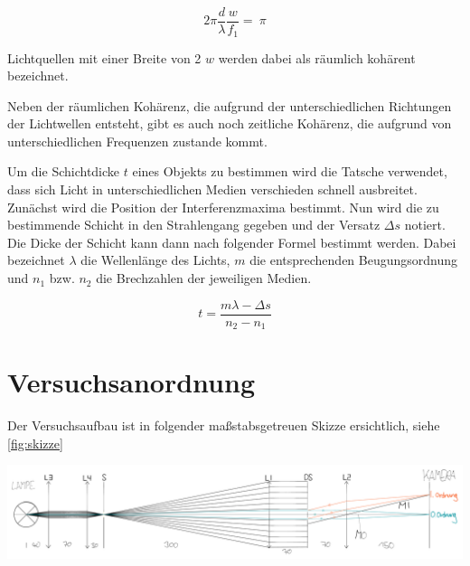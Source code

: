 \documentclass[11pt,ngerman]{scrartcl}
\begin{document}
\begin{equation}
	2\pi\frac{d}{\lambda}\frac{w}{f_1} = \ \pi
	\label{eq:minimumbedingung}
\end{equation}

\noindent Lichtquellen mit einer Breite von 2 $w$ werden dabei als räumlich kohärent bezeichnet.

\vspace{2mm}

\noindent Neben der räumlichen Kohärenz, die aufgrund der unterschiedlichen Richtungen der Lichtwellen entsteht, gibt es auch noch zeitliche Kohärenz, die aufgrund von  unterschiedlichen Frequenzen zustande kommt.

\vspace{2mm}

\noindent Um die Schichtdicke $t$ eines Objekts zu bestimmen wird die Tatsche
verwendet, dass sich Licht in unterschiedlichen Medien verschieden schnell
ausbreitet. Zunächst wird die Position der Interferenzmaxima bestimmt. Nun wird
die zu bestimmende Schicht in den Strahlengang gegeben und der Versatz $\Delta
	s$ notiert. Die Dicke der Schicht kann dann nach folgender Formel bestimmt
werden. Dabei bezeichnet $\lambda$ die Wellenlänge des Lichts, $m$ die
entsprechenden Beugungsordnung und $n_1$ bzw. $n_2$ die Brechzahlen der
jeweiligen Medien. \cite{vorlageinterfero}

\begin{equation}
	t = \frac{m\lambda - \Delta s}{n_2-n_1}
	\label{eq:dicke}
\end{equation}

\newpage

\section{Versuchsanordnung}\label{sec:Versuchsanordnung}

\noindent Der Versuchsaufbau ist in folgender maßstabsgetreuen Skizze ersichtlich, siehe \autoref{fig:skizze}

\begin{center}
	\begin{minipage}[t]{\textwidth}
		\centering
		\includegraphics[width=\textwidth]{skizze}
		\label{fig:skizze}
	\end{minipage}
\end{center}
\end{document}
